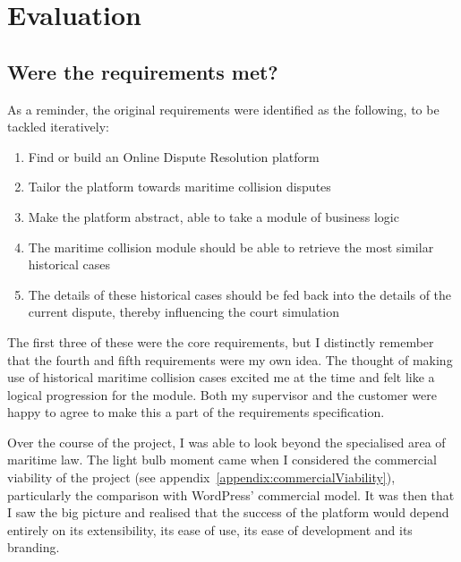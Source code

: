 \chapter{Evaluation}\label{chapter:evaluation}

\section{Were the requirements met?}

As a reminder, the original requirements were identified as the following, to be tackled iteratively:

\begin{enumerate}

    \item Find or build an Online Dispute Resolution platform

    \item Tailor the platform towards maritime collision disputes

    \item Make the platform abstract, able to take a module of business logic

    \item The maritime collision module should be able to retrieve the most similar historical cases

    \item The details of these historical cases should be fed back into the details of the current dispute, thereby influencing the court simulation

\end{enumerate}

The first three of these were the core requirements, but I distinctly remember that the fourth and fifth requirements were my own idea. The thought of making use of historical maritime collision cases excited me at the time and felt like a logical progression for the module. Both my supervisor and the customer were happy to agree to make this a part of the requirements specification.

Over the course of the project, I was able to look beyond the specialised area of maritime law. The light bulb moment came when I considered the commercial viability of the project (see appendix~\ref{appendix:commercialViability}), particularly the comparison with WordPress' commercial model. It was then that I saw the big picture and realised that the success of the platform would depend entirely on its extensibility, its ease of use, its ease of development and its branding.

